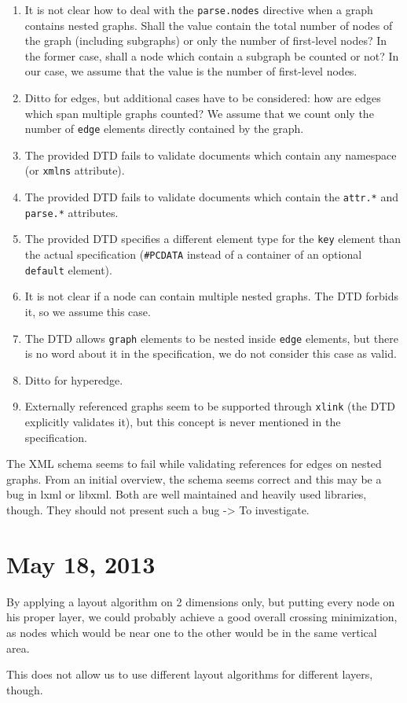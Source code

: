 \begin{enumerate}
    \item It is not clear how to deal with the \texttt{parse.nodes} directive when a graph contains nested graphs. Shall the value contain the total number of nodes of the graph (including subgraphs) or only the number of first-level nodes? In the former case, shall a node which contain a subgraph be counted or not? In our case, we assume that the value is the number of first-level nodes.
    \item Ditto for edges, but additional cases have to be considered: how are edges which span multiple graphs counted? We assume that we count only the number of \texttt{edge} elements directly contained by the graph.
    \item The provided DTD fails to validate documents which contain any namespace (or \texttt{xmlns} attribute).
    \item The provided DTD fails to validate documents which contain the \texttt{attr.*} and \texttt{parse.*} attributes.
    \item The provided DTD specifies a different element type for the \texttt{key} element than the actual specification (\texttt{\#PCDATA} instead of a container of an optional \texttt{default} element).
    \item It is not clear if a node can contain multiple nested graphs. The DTD forbids it, so we assume this case.
    \item The DTD allows \texttt{graph} elements to be nested inside \texttt{edge} elements, but there is no word about it in the specification, we do not consider this case as valid.
    \item Ditto for hyperedge.
    \item Externally referenced graphs seem to be supported through \texttt{xlink} (the DTD explicitly validates it), but this concept is never mentioned in the specification.
\end{enumerate}

The XML schema seems to fail while validating references for edges on nested graphs. From an initial overview, the schema seems correct and this may be a bug in lxml or libxml. Both are well maintained and heavily used libraries, though. They should not present such a bug -> To investigate.
 
\section{May 18, 2013}

By applying a layout algorithm on 2 dimensions only, but putting every node on his proper layer, we could probably achieve a good overall crossing minimization, as nodes which would be near one to the other would be in the same vertical area.

This does not allow us to use different layout algorithms for different layers, though.
